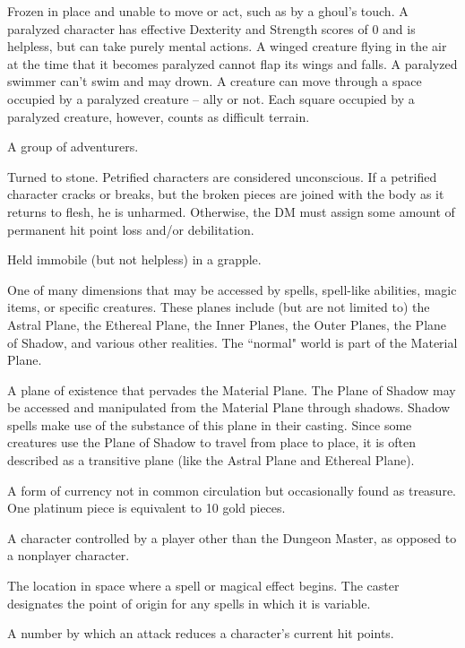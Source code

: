  Frozen in place and unable to move or act, such as by a ghoul's touch. A paralyzed character has effective Dexterity 
and Strength scores of 0 and is helpless, but can take purely mental 
actions. A winged creature flying in the air at the time that it 
becomes paralyzed cannot flap its wings and falls. A paralyzed 
swimmer can't swim and may drown. A creature can move through a 
space occupied by a paralyzed creature -- ally or not. Each square 
occupied by a paralyzed creature, however, counts as difficult terrain.

 A group of adventurers. 

 Turned to stone. Petrified characters are considered 
unconscious. If a petrified character cracks or breaks, but the broken 
pieces are joined with the body as it returns to flesh, he is 
unharmed. Otherwise, the DM must assign some amount of permanent hit point loss and/or debilitation. 

 Held immobile (but not helpless) in a grapple. 

 One of many dimensions that may be 
accessed by spells, spell-like abilities, magic items, or specific creatures. These planes include (but are not limited to) the Astral Plane, 
the Ethereal Plane, the Inner Planes, the Outer Planes, the Plane of 
Shadow, and various other realities. The ``normal" world is part of 
the Material Plane. 

 A plane of existence that pervades the Material 
Plane. The Plane of Shadow may be accessed and manipulated from 
the Material Plane through shadows. Shadow spells make use of the 
substance of this plane in their casting. Since some creatures use the 
Plane of Shadow to travel from place to place, it is often described as 
a transitive plane (like the Astral Plane and Ethereal Plane). 

 A form of currency not in common 
circulation but occasionally found as treasure. One platinum piece is 
equivalent to 10 gold pieces. 

 A character controlled by a player other 
than the Dungeon Master, as opposed to a nonplayer character. 

 The location in space where a spell or magical 
effect begins. The caster designates the point of origin for any spells 
in which it is variable. 

 A number by which an attack reduces a 
character's current hit points. 

